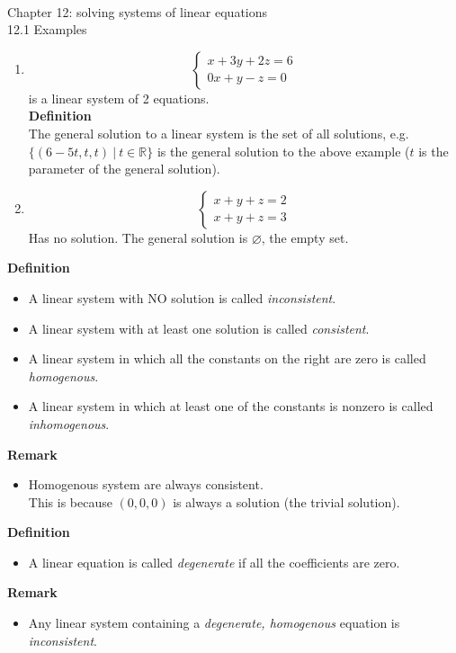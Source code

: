 \documentclass[]{article}
\let\emptyset\varnothing
\begin{document}
		\pagebreak\\
		\Large{Chapter 12: solving systems of linear equations}\\
		\large{12.1 Examples}\\
		\normalsize
		\begin{enumerate}
			\item $$\begin{cases}
				x+3y+2z=6\\
				0x+y-z=0
			\end{cases}$$
			is a linear system of 2 equations.\\
			{\bf Definition}\\
			The general solution to a linear system is the set of all solutions, e.g. $\{(6-5t,t,t)~|~t\in\mathbb{R}\}$ is the general solution to the above example ($t$ is the parameter of the general solution).
			\item $$\begin{cases}
				x+y+z=2\\
				x+y+z=3
			\end{cases}$$
			Has no solution. The general solution is $\emptyset$, the empty set.\\
		\end{enumerate}
		{\bf Definition}\\
		\begin{itemize}
			\item A linear system with NO solution is called \emph{inconsistent}.
			\item A linear system with at least one solution is called \emph{consistent}.
			\item A linear system in which all the constants on the right are zero is called \emph{homogenous}.
			\item A linear system in which at least one of the constants is nonzero is called \emph{inhomogenous}.
		\end{itemize}
		{\bf Remark}
		\begin{itemize}
			\item Homogenous system are always consistent.\\
			This is because $(0,0,0)$ is always a solution (the trivial solution).
		\end{itemize}
		{\bf Definition}
		\begin{itemize}
			\item A linear equation is called \emph{degenerate} if all the coefficients are zero. 
		\end{itemize}
		{\bf Remark}
		\begin{itemize}
			\item Any linear system containing a \emph{degenerate, homogenous} equation is \emph{inconsistent}.
		\end{itemize}
\end{document}
